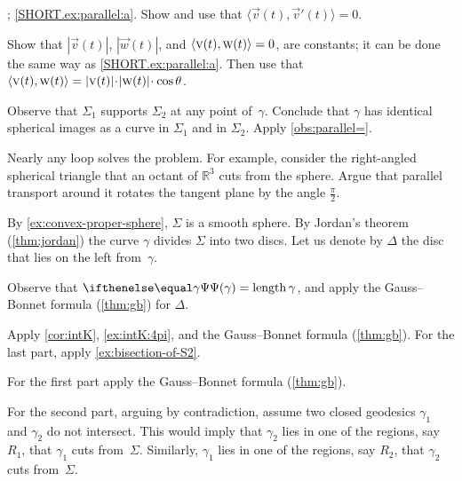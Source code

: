 \begin{multicols}{2}
 
\setcounter{eqtn}{0}

\parbf{\ref{ex:parallel}}; \ref{SHORT.ex:parallel:a}.
Show and use that $\langle\vec v(t),\vec v'(t)\rangle=0$.

\parit{\ref{SHORT.ex:parallel:b}}
Show that $|\vec v(t)|$, $|\vec w(t)|$, and
$\langle\vec v(t),\vec w(t)\rangle\z=0$,
are constants; it can be done the same way as \ref{SHORT.ex:parallel:a}.
Then use that 
$\langle\vec v(t),\vec w(t)\rangle\z=|\vec v(t)|\cdot|\vec w(t)|\cdot\cos\theta$.


\setcounter{eqtn}{0}

Observe that $\Sigma_1$ supports $\Sigma_2$ at any point of~$\gamma$.
Conclude that $\gamma$ has identical spherical images as a curve in $\Sigma_1$ and in $\Sigma_2$.
Apply \ref{obs:parallel=}.

Nearly any loop solves the problem.
For example, consider the right-angled spherical triangle that an octant of $\mathbb{R}^3$ cuts from the sphere.
Argue that parallel transport around it rotates the tangent plane by the angle $\tfrac\pi 2$. 

\setcounter{eqtn}{0}

By \ref{ex:convex-proper-sphere}, $\Sigma$ is a smooth sphere.
By Jordan's theorem (\ref{thm:jordan}) the curve $\gamma$ divides $\Sigma$ into two discs.
Let us denote by $\Delta$ the disc that lies on the left from~$\gamma$.

Observe that $\tgc\gamma=\length\gamma$, and apply the Gauss--Bonnet formula (\ref{thm:gb}) for $\Delta$.

Apply \ref{cor:intK}, \ref{ex:intK:4pi}, and the Gauss--Bonnet formula (\ref{thm:gb}).
For the last part, apply \ref{ex:bisection-of-S2}.

 For the first part apply the Gauss--Bonnet formula (\ref{thm:gb}).

For the second part, arguing by contradiction, assume two closed geodesics $\gamma_1$ and $\gamma_2$ do not intersect. 
This would imply that $\gamma_2$ lies in one of the regions, say $R_1$, that $\gamma_1$ cuts from~$\Sigma$.
Similarly, $\gamma_1$ lies in one of the regions, say $R_2$, that $\gamma_2$ cuts from~$\Sigma$.


\end{multicols}
